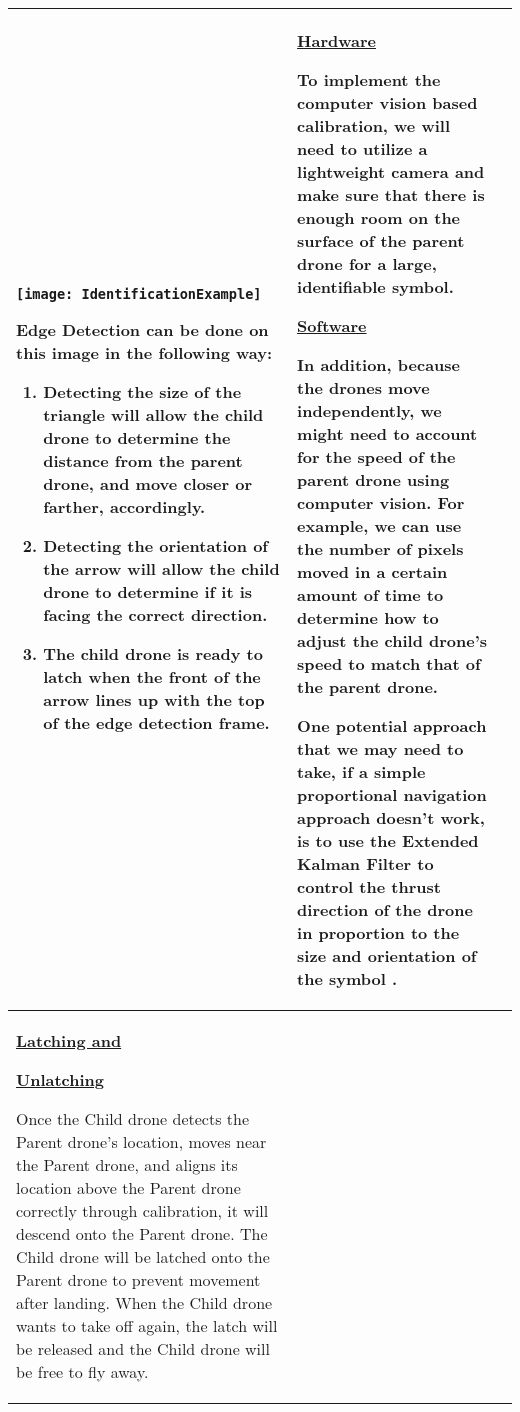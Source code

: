 \documentclass[paper=a4, fontsize=12pt]{scrartcl}
\begin{document}
\begin{longtable} { |p{}|p{}|p{}| }
	\begin{center}
		\texttt{[image: IdentificationExample]}
	\end{center}

	Edge Detection can be done on this image in the following way:
	\begin{enumerate}
		\item Detecting the size of the triangle will allow the child drone to determine the distance from the parent drone, and move closer or farther, accordingly.
		\item Detecting the orientation of the arrow will allow the child drone to determine if it is facing the correct direction.
		\item The child drone is ready to latch when the front of the arrow lines up with the top of the edge detection frame. 
	\end{enumerate} 
	& 
	\underline{Hardware}\par
	To implement the computer vision based calibration, we will need to utilize a lightweight camera and make sure that there is enough room on the surface of the parent drone for a large, identifiable symbol.\par\hfill\par 
	\underline{Software}\par
	In addition, because the drones move independently, we might need to account for the speed of the parent drone using computer vision.
	For example, we can use the number of pixels moved in a certain amount of time to determine how to adjust the child drone's speed to match that of the parent drone.\par\hfill\par 
	One potential approach that we may need to take, if a simple proportional navigation approach doesn't work, is to use the Extended Kalman Filter to control the thrust direction of the drone in proportion to the size and orientation of the symbol \cite{falanga2017ssrr}. \\
	\hline
	\underline{\textbf{Latching and}}\par\underline{\textbf{Unlatching}}\par
	Once the Child drone detects the Parent drone's location, moves near the Parent drone, and aligns its location above the Parent drone correctly through calibration, it will descend onto the Parent drone.
	The Child drone will be latched onto the Parent drone to prevent movement after landing.
	When the Child drone wants to take off again, the latch will be released and the Child drone will be free to fly away.

\end{longtable}
\end{document}
